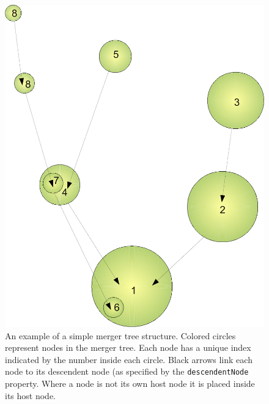\begin{figure}
 \begin{center}
 \includegraphics[width=160mm]{Diagrams/MergerTreeSimple.pdf}
 \end{center}
 \caption{An example of a simple merger tree structure. Colored circles represent nodes in the merger tree. Each node has a unique index indicated by the number inside each circle. Black arrows link each node to its descendent node (as specified by the {\tt descendentNode} property. Where a node is not its own host node it is placed inside its host node.}
 \label{fig:MergerTreeSimple}
\end{figure}

